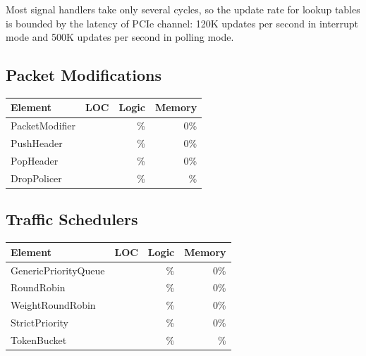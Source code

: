 Most signal handlers take only several cycles, so the update rate for lookup tables is bounded by the latency of PCIe channel: 120K updates per second in interrupt mode and 500K updates per second in polling mode.

\subsection{Packet Modifications}

\begin{table}[h!]
	\centering
	\label{clicknp:tab:PacketModElements}
	\begin{tabular}{l|r|r|r}
		Element & LOC & Logic & Memory \\
		\hline
		PacketModifier 	& & \% & 0\% \\
		PushHeader		& & \% & 0\% \\
		PopHeader		& & \% & 0\% \\
		DropPolicer 	& & \% & \% \\
	\end{tabular}
\end{table}

\subsection{Traffic Schedulers}

\begin{table}[h!]
	\centering
	\label{clicknp:tab:TrafficSchedulers}
	\begin{tabular}{l|r|r|r}
		Element & LOC & Logic & Memory \\
		\hline
		GenericPriorityQueue 	& & \% & 0\% \\
		RoundRobin		& & \% & 0\% \\
		WeightRoundRobin		& & \% & 0\% \\
		StrictPriority		& & \% & 0\% \\
		TokenBucket 	& & \% & \% \\
	\end{tabular}
\end{table}

